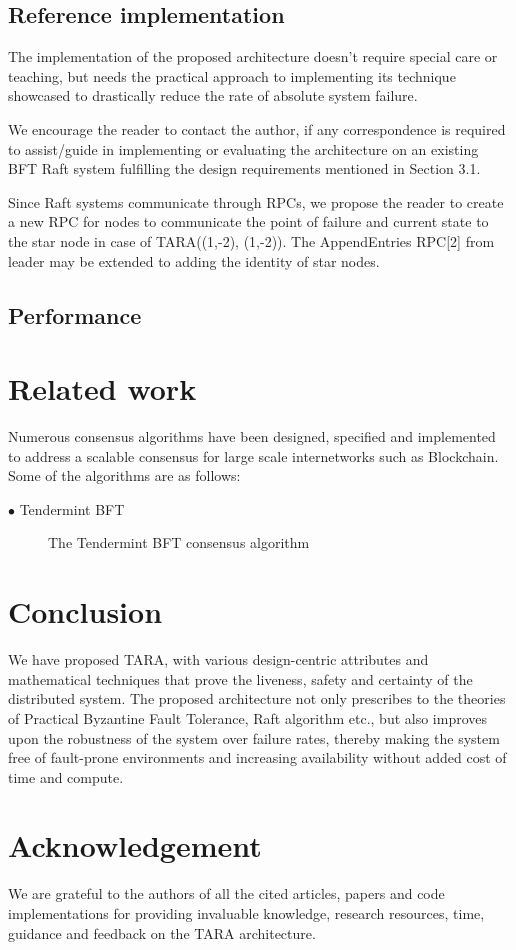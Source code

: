 \documentclass[]{article}
\begin{document}
\subsection{Reference implementation}
The implementation of the proposed architecture doesn’t require special care or teaching, but needs the practical approach to implementing its technique showcased to drastically reduce the rate of absolute system failure. 

We encourage the reader to contact the author, if any correspondence is required to assist/guide in implementing or evaluating the architecture on an existing BFT Raft system fulfilling the design requirements mentioned in Section 3.1.

Since Raft systems communicate through RPCs, we propose the reader to create a new RPC for nodes to communicate the point of failure and current state to the star node in case of TARA((1,-2), (1,-2)). The AppendEntries RPC[2] from leader may be extended to adding the identity of star nodes.

\subsection{Performance}

\section{Related work}
Numerous consensus algorithms have been designed, specified and implemented to address a scalable consensus for large scale internetworks such as Blockchain. Some of the algorithms are as follows:
\begin{description}
	\item[$\bullet$ Tendermint BFT] The Tendermint BFT consensus algorithm
\end{description}

\section{Conclusion}
We have proposed TARA, with various design-centric attributes and mathematical techniques that prove the liveness, safety and certainty of the distributed system. The proposed architecture not only prescribes to the theories of Practical Byzantine Fault Tolerance, Raft algorithm etc., but also improves upon the robustness of the system over failure rates, thereby making the system free of fault-prone environments and increasing availability without added cost of time and compute.

\section{Acknowledgement}
We are grateful to the authors of all the cited articles, papers and code implementations for providing invaluable knowledge, research resources, time, guidance and feedback on the TARA architecture.

 

\end{document}
